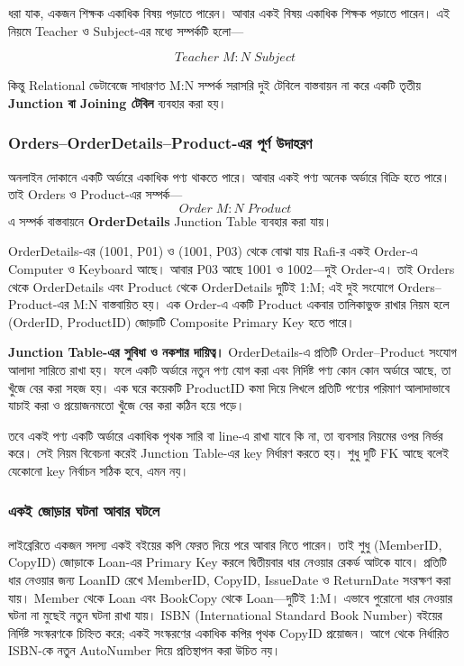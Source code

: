 ধরা যাক, একজন শিক্ষক একাধিক বিষয় পড়াতে পারেন। আবার একই বিষয় একাধিক শিক্ষক পড়াতে পারেন। এই নিয়মে Teacher ও Subject-এর মধ্যে সম্পর্কটি হলো---

\[
\boxed{
Teacher \; M:N \; Subject
}
\]


কিন্তু Relational ডেটাবেজে সাধারণত M:N সম্পর্ক সরাসরি
দুই টেবিলে বাস্তবায়ন না করে একটি তৃতীয়
\textbf{Junction বা Joining টেবিল} ব্যবহার করা হয়।



\subsubsection{Orders–OrderDetails–Product-এর পূর্ণ উদাহরণ}

অনলাইন দোকানে একটি অর্ডারে একাধিক পণ্য থাকতে পারে। আবার একই পণ্য অনেক অর্ডারে বিক্রি হতে পারে। তাই Orders ও Product-এর সম্পর্ক--- \[
Order
\;M:N\;
Product
\] এ সম্পর্ক বাস্তবায়নে \textbf{OrderDetails} Junction Table ব্যবহার
করা যায়।



OrderDetails-এর (1001, P01) ও (1001, P03) থেকে বোঝা যায় Rafi-র একই
Order-এ Computer ও Keyboard আছে। আবার P03 আছে 1001 ও 1002—দুই
Order-এ। তাই Orders থেকে OrderDetails এবং Product থেকে OrderDetails
দুটিই 1:M; এই দুই সংযোগে Orders--Product-এর M:N বাস্তবায়িত হয়।
এক Order-এ একটি Product একবার তালিকাভুক্ত রাখার নিয়ম হলে
(OrderID, ProductID) জোড়াটি Composite Primary Key হতে পারে।



\textbf{Junction Table-এর সুবিধা ও নকশার দায়িত্ব।} OrderDetails-এ প্রতিটি Order--Product সংযোগ আলাদা সারিতে রাখা হয়। ফলে একটি অর্ডারে নতুন পণ্য যোগ করা এবং নির্দিষ্ট পণ্য কোন কোন অর্ডারে আছে, তা খুঁজে বের করা সহজ হয়। এক ঘরে কয়েকটি ProductID কমা দিয়ে লিখলে প্রতিটি পণ্যের পরিমাণ আলাদাভাবে যাচাই করা ও প্রয়োজনমতো খুঁজে বের করা কঠিন হয়ে পড়ে।

তবে একই পণ্য একটি অর্ডারে একাধিক পৃথক সারি বা line-এ রাখা যাবে কি না, তা ব্যবসার নিয়মের ওপর নির্ভর করে। সেই নিয়ম বিবেচনা করেই Junction Table-এর key নির্ধারণ করতে হয়। শুধু দুটি FK আছে বলেই যেকোনো key নির্বাচন সঠিক হবে, এমন নয়।

\subsubsection{একই জোড়ার ঘটনা আবার ঘটলে}
লাইব্রেরিতে একজন সদস্য একই বইয়ের কপি ফেরত দিয়ে পরে আবার নিতে পারেন। তাই শুধু (MemberID, CopyID) জোড়াকে Loan-এর Primary Key করলে দ্বিতীয়বার ধার নেওয়ার রেকর্ড আটকে যাবে। প্রতিটি ধার নেওয়ার জন্য LoanID রেখে MemberID, CopyID, IssueDate ও ReturnDate সংরক্ষণ করা যায়। Member থেকে Loan এবং BookCopy থেকে Loan---দুটিই 1:M। এভাবে পুরোনো ধার নেওয়ার ঘটনা না মুছেই নতুন ঘটনা রাখা যায়। ISBN (International Standard Book Number) বইয়ের নির্দিষ্ট সংস্করণকে চিহ্নিত করে; একই সংস্করণের একাধিক কপির পৃথক CopyID প্রয়োজন। আগে থেকে নির্ধারিত ISBN-কে নতুন AutoNumber দিয়ে প্রতিস্থাপন করা উচিত নয়।

